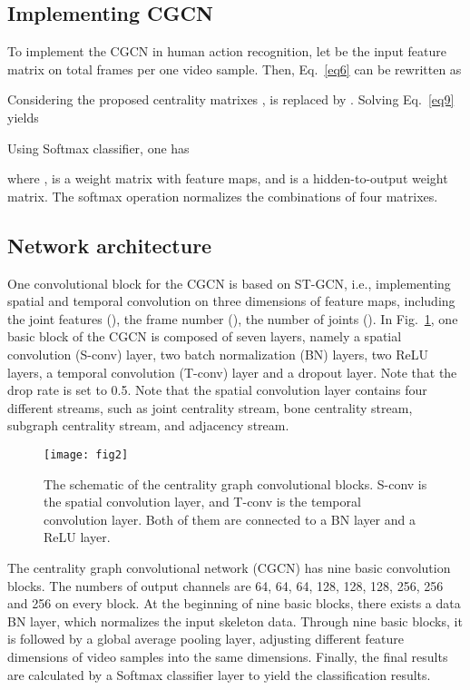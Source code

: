 \documentclass[runningheads]{llncs}
\begin{document}
\subsection{Implementing CGCN}
To implement the CGCN in human action recognition, let  be the input feature matrix on total frames per one video sample. Then, Eq.~\ref{eq6} can be rewritten as


Considering the proposed centrality matrixes ,  is replaced by . Solving Eq.~\ref{eq9} yields


Using Softmax classifier, one has

where ,  is a weight matrix with  feature maps, and  is a hidden-to-output weight matrix. The softmax operation normalizes the combinations of four matrixes.

\subsection{Network architecture}
One convolutional block for the CGCN is based on ST-GCN, i.e., implementing spatial and temporal convolution on three dimensions of feature maps, including the joint features (), the frame number (), the number of joints (). In Fig.~\ref{fig2}, one basic block of the CGCN is composed of seven layers, namely a spatial convolution (S-conv) layer, two batch normalization (BN) layers, two ReLU layers, a temporal convolution (T-conv) layer and a dropout layer. Note that the drop rate is set to 0.5. Note that the spatial convolution layer contains four different streams, such as joint centrality stream, bone centrality stream, subgraph centrality stream, and adjacency stream. 
\begin{figure}
\centering
\texttt{[image: fig2]}
\caption{The schematic of the centrality graph convolutional blocks. S-conv is the spatial convolution layer, and T-conv is the temporal convolution layer. Both of them are connected to a BN layer and a ReLU layer.}
\label{fig2}
\end{figure}

The centrality graph convolutional network (CGCN) has nine basic convolution blocks. The numbers of output channels are 64, 64, 64, 128, 128, 128, 256, 256 and 256 on every block. At the beginning of nine basic blocks, there exists a data BN layer, which normalizes the input skeleton data. Through nine basic blocks, it is followed by a global average pooling layer, adjusting different feature dimensions of video samples into the same dimensions. Finally, the final results are calculated by a Softmax classifier layer to yield the classification results.
\end{document}
